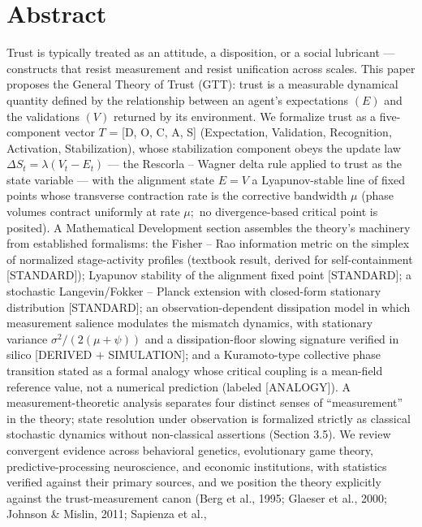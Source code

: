 \documentclass[
]{article}
\author{}
\date{}
\begin{document}
\section{Abstract}\label{abstract}

Trust is typically treated as an attitude, a disposition, or a social
lubricant --- constructs that resist measurement and resist unification
across scales. This paper proposes the General Theory of Trust (GTT):
trust is a measurable dynamical quantity defined by the relationship
between an agent's expectations \((E)\) and the validations \((V)\)
returned by its environment. We formalize trust as a five-component
vector \(T\) = {[}D, O, C, A, S{]} (Expectation, Validation,
Recognition, Activation, Stabilization), whose stabilization component
obeys the update law \(\Delta S_t = \lambda(V_t - E_t)\) --- the
Rescorla -- Wagner delta rule applied to trust as the state variable ---
with the alignment state \(E = V\) a Lyapunov-stable line of fixed
points whose transverse contraction rate is the corrective bandwidth
\(\mu\) (phase volumes contract uniformly at rate \(\mu;\) no
divergence-based critical point is posited). A Mathematical Development
section assembles the theory's machinery from established formalisms:
the Fisher -- Rao information metric on the simplex of normalized
stage-activity profiles (textbook result, derived for self-containment
{[}STANDARD{]}); Lyapunov stability of the alignment fixed point
{[}STANDARD{]}; a stochastic Langevin/Fokker -- Planck extension with
closed-form stationary distribution {[}STANDARD{]}; an
observation-dependent dissipation model in which measurement salience
modulates the mismatch dynamics, with stationary variance
\(\sigma^{2}/(2(\mu+\psi))\) and a dissipation-floor slowing signature
verified in silico {[}DERIVED + SIMULATION{]}; and a Kuramoto-type
collective phase transition stated as a formal analogy whose critical
coupling is a mean-field reference value, not a numerical prediction
(labeled {[}ANALOGY{]}). A measurement-theoretic analysis separates four
distinct senses of ``measurement'' in the theory; state resolution under
observation is formalized strictly as classical stochastic dynamics
without non-classical assertions (Section 3.5). We review convergent
evidence across behavioral genetics, evolutionary game theory,
predictive-processing neuroscience, and economic institutions, with
statistics verified against their primary sources, and we position the
theory explicitly against the trust-measurement canon (Berg et al.,
1995; Glaeser et al., 2000; Johnson \& Mislin, 2011; Sapienza et al.,
\end{document}
